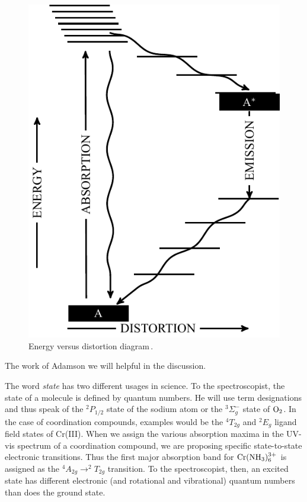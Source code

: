 \begin{figure}
	\centering
	\centering
	\addtocounter{totalfigures}{1} 
	\includegraphics[width=.6\linewidth]{figures/Chapter2/energydistoration}
	\caption{Energy versus distortion diagram\,\cite{adamson-1983}.}
	\label{fig:energydistoration}	
\end{figure}

The work of Adamson\cite{adamson-1983} we will helpful in the discussion.\par

The word \emph{state} has two different usages in science. To the spectroscopist, the state of a molecule is defined by quantum numbers. He will use term designations and thus speak of the $^2P_{1/2}$ state of the sodium atom or the $^3\Sigma^-_g $ state of $\rm O_2$. In the case of coordination compounds, examples would be the $^4T_{2g}$ and $^2E_g$ ligand field states of Cr(III). When we assign the various absorption maxima in the UV-vis spectrum of a coordination compound, we are proposing specific state-to-state electronic transitions. Thus the first major absorption band for $\rm Cr(NH_3)_6^{3+}$ is assigned as the $^4A_{2g}\rightarrow ^2T_{2g}$ transition. To the spectroscopist, then, an excited state has different electronic (and rotational and vibrational) quantum numbers than does the ground state.\cite{adamson-1983}\par

